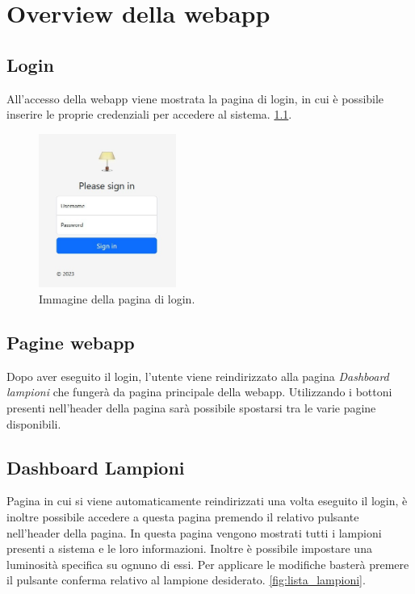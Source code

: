 \chapter{Overview della webapp}

\section{Login}
All'accesso della webapp viene mostrata la pagina di login, in cui è possibile inserire le proprie credenziali per accedere al sistema. \ref{fig:login}.

\begin{figure}[ht]
    \centering
    \includegraphics[width=0.4\textwidth]{img/login.jpg}
    \caption{Immagine della pagina di login.}
    \label{fig:login}
\end{figure}

\section{Pagine webapp}

Dopo aver eseguito il login, l'utente viene reindirizzato alla pagina \textit{Dashboard lampioni} che fungerà da pagina principale della webapp. Utilizzando i bottoni presenti nell'header della pagina sarà possibile spostarsi tra le varie pagine disponibili.

\section{Dashboard Lampioni}

Pagina in cui si viene automaticamente reindirizzati una volta eseguito il login, è inoltre possibile accedere a questa pagina premendo il relativo pulsante nell'header della pagina. In questa pagina vengono mostrati tutti i lampioni presenti a sistema e le loro informazioni. Inoltre è possibile impostare una luminosità specifica su ognuno di essi. Per applicare le modifiche basterà premere il pulsante conferma relativo al lampione desiderato. \ref{fig:lista_lampioni}.


